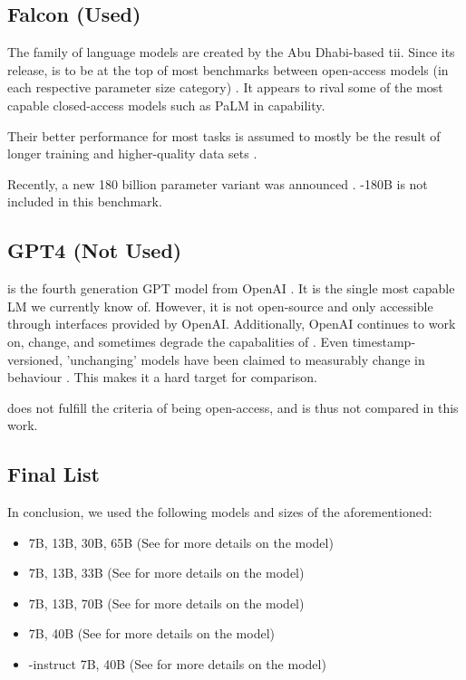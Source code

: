 \subsection{Falcon (Used)}\label{sub:falcon}
The  \cite{zxhang_falcon_2023} family of language models are created by the Abu Dhabi-based \gls{tii}.
Since its release,  is to be at the top of most benchmarks between open-access models (in each respective parameter size category) \cite{zxhang_falcon_2023}.
It appears to rival some of the most capable closed-access models such as \gls{PaLM} in capability.

Their better performance for most tasks is assumed to mostly be the result of longer training and higher-quality data sets \cite{zxhang_falcon_2023}.

Recently, a new 180 billion parameter  variant was announced \cite{tii_falcon180b_2023}. -180B is not included in this benchmark.


\subsection{GPT4 (Not Used)}\label{sub:GPT4}
 is the fourth generation \gls{GPT} model from \gls{OpenAI} \cite{openai_gpt4_2023}.
It is the single most capable \acrlong{LM} we currently know of.
However, it is not open-source and only accessible through interfaces provided by \gls{OpenAI}.
Additionally, \gls{OpenAI} continues to work on, change, and sometimes degrade the capabalities of  \cite{chen_how_2023}.
Even timestamp-versioned, 'unchanging' models have been claimed to measurably change in behaviour \cite{jw1224_hn}.
This makes it a hard target for comparison.

 does not fulfill the criteria of being open-access, and is thus not compared in this work.


\subsection{Final List}\label{sub:list}
In conclusion, we used the following models and sizes of the aforementioned:
\begin{itemize}
    \item {} 7B, 13B, 30B, 65B (See  for more details on the model)
    \item {} 7B, 13B, 33B (See  for more details on the model)
    \item {} 7B, 13B, 70B (See  for more details on the model)
    \item {} 7B, 40B (See  for more details on the model)
    \item {}-instruct 7B, 40B (See  for more details on the model)
\end{itemize}
